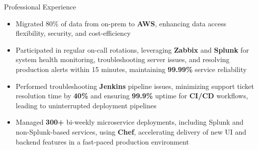 \documentclass{resume}
\begin{document}
\begin{experienceSection}{Professional Experience}
    \experienceItem[
        company={Cerner Healthcare},
        location={Bangalore, India},
        position={System Engineer - 1},
        duration={May 2021 - Jul 2023}
    ]
    \begin{itemize}
        \itemsep -6pt {}
        \item Migrated 80\% of data from on-prem to \textbf{AWS}, enhancing data access flexibility, security, and cost-efficiency
        \item Participated in regular on-call rotations, leveraging \textbf{Zabbix} and \textbf{Splunk} for system health monitoring, troubleshooting server issues, and resolving production alerts within 15 minutes, maintaining \textbf{99.99\%} service reliability
        \item Performed troubleshooting \textbf{Jenkins} pipeline issues, minimizing support ticket resolution time by \textbf{40\%} and ensuring \textbf{99.9\%} uptime for \textbf{CI/CD} workflows, leading to uninterrupted deployment pipelines
        \item Managed \textbf{300+} bi-weekly microservice deployments, including Splunk and non-Splunk-based services, using \textbf{Chef}, accelerating delivery of new UI and backend features in a fast-paced production environment
    \end{itemize}

\end{experienceSection}
\end{document}
